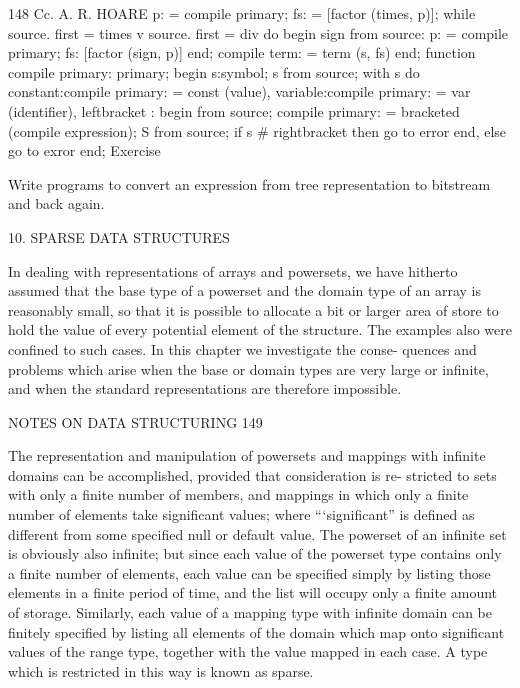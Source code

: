 {{		148 Cc. A. R. HOARE p: = compile primary; fs: = [factor (times, p)]; while source. first = times v source. first = div do begin sign from source: p: = compile primary; fs: [factor (sign, p)] end; compile term: = term (s, fs) end; function compile primary: primary; begin s:symbol; s from source; with s do {constant:compile primary: = const (value), variable:compile primary: = var (identifier), leftbracket : begin from source; compile primary: = bracketed (compile expression); S from source; if s # rightbracket then go to error end, else go to exror} end; Exercise
		
		Write programs to convert an expression from tree representation to bitstream and back again.
		
		10. SPARSE DATA STRUCTURES
		
		In dealing with representations of arrays and powersets, we have hitherto assumed that the base type of a powerset and the domain type of an array is reasonably small, so that it is possible to allocate a bit or larger area of store to hold the value of every potential element of the structure. The examples also were confined to such cases. In this chapter we investigate the conse- quences and problems which arise when the base or domain types are very large or infinite, and when the standard representations are therefore impossible.
		
		NOTES ON DATA STRUCTURING 149
		
		The representation and manipulation of powersets and mappings with infinite domains can be accomplished, provided that consideration is re- stricted to sets with only a finite number of members, and mappings in which only a finite number of elements take significant values; where “‘significant” is defined as different from some specified null or default value. The powerset of an infinite set is obviously also infinite; but since each value of the powerset type contains only a finite number of elements, each value can be specified simply by listing those elements in a finite period of time, and the list will occupy only a finite amount of storage. Similarly, each value of a mapping type with infinite domain can be finitely specified by listing all elements of the domain which map onto significant values of the range type, together with the value mapped in each case. A type which is restricted in this way is known as sparse.
		
}}
